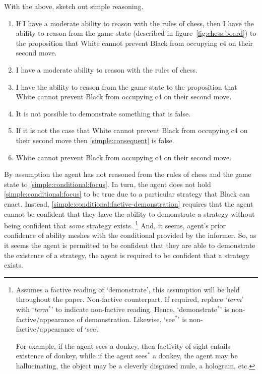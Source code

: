 \documentclass[10pt]{article}
\newcommand{\nf}[1]{#1\ensuremath{^{{*}}}}
\begin{document}
\begin{note}
  With the above, sketch out simple reasoning.
 {
   \color{red}
   \begin{enumerate}
   \item\label{simple:conditional:claim} If I have a moderate ability to reason with the rules of chess, then I have the ability to reason from the game state (described in figure~\ref{fig:chess:board}) to the proposition that White cannot prevent Black from occupying c4 on their second move.
   \item\label{simple:conditional:antecedent} I have a moderate ability to reason with the rules of chess.
   \item\label{simple:conditional:consequent} I have the ability to reason from the game state to the proposition that White cannot prevent Black from occupying c4 on their second move.
   \item\label{simple:conditional:factive-demonstration} It is not possible to demonstrate something that is false.
   \item\label{simple:conditional:necessity} If it is not the case that White cannot prevent Black from occupying c4 on their second move then \ref{simple:consequent} is false.
   \item\label{simple:conditional:focus} White cannot prevent Black from occupying c4 on their second move.
   \end{enumerate}
 }
\end{note}

By assumption the agent has not reasoned from the rules of chess and the game state to \ref{simple:conditional:focus}.
In turn, the agent does not hold \ref{simple:conditional:focus} to be true due to a particular strategy that Black can enact.
Instead, \ref{simple:conditional:factive-demonstration} requires that the agent cannot be confident that they have the ability to demonstrate a strategy without being confident that \emph{some} strategy exists.\nolinebreak
\footnote{
  Assumes a factive reading of `demonstrate', this assumption will be held throughout the paper.
  Non-factive counterpart.
  If required, replace `\emph{term}' with `\nf{\emph{term}}' to indicate non-factive reading.
  Hence, `\nf{demonstrate}' is non-factive/appearance of demonstration.
  Likewise, `\nf{see}' is non-factive/appearance of `see'.

  For example, if the agent sees a donkey, then factivity of sight entails existence of donkey, while if the agent \nf{sees} a donkey, the agent may be hallucinating, the object may be a cleverly disguised mule, a hologram, etc.
}
And, it seems, agent's prior confidence of ability meshes with the conditional provided by the informer.
So, as it seems the agent is permitted to be confident that they are able to demonstrate the existence of a strategy, the agent is required to be confident that a strategy exists.
\end{document}
